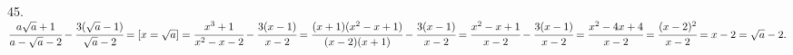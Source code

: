 45. $\cfrac{a\sqrt{a}+1}{a-\sqrt{a}-2}-\cfrac{3(\sqrt{a}-1)}{\sqrt{a}-2}=[x=\sqrt{a}]=
\cfrac{x^3+1}{x^2-x-2}-\cfrac{3(x-1)}{x-2}=\cfrac{(x+1)(x^2-x+1)}{(x-2)(x+1)}-\cfrac{3(x-1)}{x-2}=
\cfrac{x^2-x+1}{x-2}-\cfrac{3(x-1)}{x-2}=\cfrac{x^2-4x+4}{x-2}=\cfrac{(x-2)^2}{x-2}=x-2=\sqrt{a}-2.$\\
